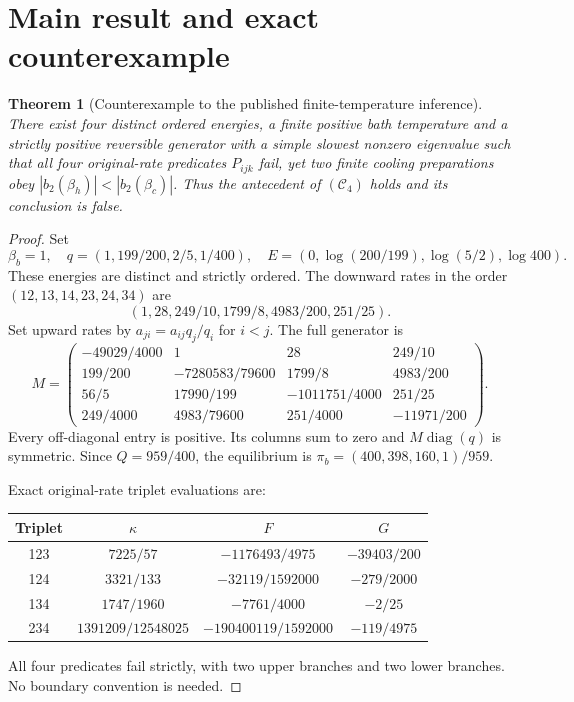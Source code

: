 \documentclass[11pt]{article}
\newtheorem{theorem}{Theorem}
\newcommand{\diag}{\operatorname{diag}}
\begin{document}
\section{Main result and exact counterexample}
\begin{theorem}[Counterexample to the published finite-temperature inference]\label{thm:counterexample}
There exist four distinct ordered energies, a finite positive bath temperature and a strictly positive reversible generator with a simple slowest nonzero eigenvalue such that all four original-rate predicates $P_{ijk}$ fail, yet two finite cooling preparations obey $|b_2(\beta_h)|<|b_2(\beta_c)|$. Thus the antecedent of $(\mathcal C_4)$ holds and its conclusion is false.
\end{theorem}
\begin{proof}
Set
\[
\beta_b=1,\quad q=(1,199/200,2/5,1/400),\quad
E=(0,\log(200/199),\log(5/2),\log400).
\]
These energies are distinct and strictly ordered. The downward rates in the order $(12,13,14,23,24,34)$ are
\[
(1,28,249/10,1799/8,4983/200,251/25).
\]
Set upward rates by $a_{ji}=a_{ij}q_j/q_i$ for $i<j$. The full generator is
\[
M=\begin{pmatrix}
-49029/4000&1&28&249/10\\
199/200&-7280583/79600&1799/8&4983/200\\
56/5&17990/199&-1011751/4000&251/25\\
249/4000&4983/79600&251/4000&-11971/200
\end{pmatrix}.
\]
Every off-diagonal entry is positive. Its columns sum to zero and $M\diag(q)$ is symmetric. Since $Q=959/400$, the equilibrium is $\pi_b=(400,398,160,1)/959$.

Exact original-rate triplet evaluations are:
\begin{center}
\begin{tabular}{cccc}
\toprule Triplet&$\kappa$&$F$&$G$\\\midrule
123&$7225/57$&$-1176493/4975$&$-39403/200$\\
124&$3321/133$&$-32119/1592000$&$-279/2000$\\
134&$1747/1960$&$-7761/4000$&$-2/25$\\
234&$1391209/12548025$&$-190400119/1592000$&$-119/4975$\\\bottomrule
\end{tabular}
\end{center}
All four predicates fail strictly, with two upper branches and two lower branches. No boundary convention is needed.


\end{proof}
\end{document}
